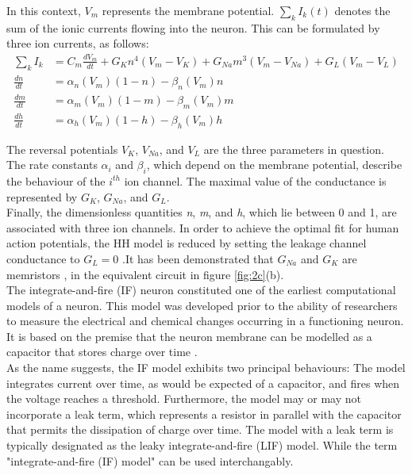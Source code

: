 \noindent In this context, $V_m$ represents the membrane potential. $\sum_{k}^{}I_k(t)$ denotes the sum of the ionic currents flowing into the neuron. This can be formulated by three ion currents, as follows:
\begin{align}
    \sum_{k}^{}I_k &= C_m \frac{dV_m}{dt} + G_Kn^4(V_m - V_K) + G_{Na}m^3(V_m - V_{Na}) + G_L (V_m - V_L) \label{eq:2.2} \\
    \frac{dn}{dt} &= \alpha_n(V_m)(1-n)-\beta_n(V_m)n \label{eq:2.3} \\
    \frac{dm}{dt} &= \alpha_m(V_m)(1-m) - \beta_m(V_m)m \label{eq:2.4} \\
    \frac{dh}{dt} &= \alpha_h(V_m)(1-h)-\beta_h(V_m)h \label{eq:2.5}
\end{align}

\noindent The reversal potentials $V_K$, $V_{Na}$, and $V_L$ are the three parameters in question. The rate constants $\alpha_i$ and $\beta_i$, which depend on the membrane potential, describe the behaviour of the $i^{th}$ ion channel. The maximal value of the conductance is represented by $G_K$, $G_{Na}$, and $G_L$. \\

\noindent Finally, the dimensionless quantities \textit{n}, \textit{m}, and \textit{h}, which lie between 0 and 1, are associated with three ion channels. In order to achieve the optimal fit for human action potentials, the HH model is reduced by setting the leakage channel conductance to $G_L = 0$  \cite{noble1962modification}.It has been demonstrated that $G_{Na}$ and $G_K$ are memristors \cite{chua1976memristive}, in the equivalent circuit in figure \ref{fig:2c}(b). \\

\noindent The integrate-and-fire (IF) neuron \cite{lapicque1907louis} constituted one of the earliest computational models of a neuron. This model was developed prior to the ability of researchers to measure the electrical and chemical changes occurring in a functioning neuron. It is based on the premise that the neuron membrane can be modelled as a capacitor that stores charge over time \cite{abbott1999lapicque}.\\

\noindent As the name suggests, the IF model exhibits two principal behaviours: The model integrates current over time, as would be expected of a capacitor, and fires when the voltage reaches a threshold. Furthermore, the model may or may not incorporate a leak term, which represents a resistor in parallel with the capacitor that permits the dissipation of charge over time. The model with a leak term is typically designated as the leaky integrate-and-fire (LIF) model. While the term "integrate-and-fire (IF) model" can be used interchangably. \\

